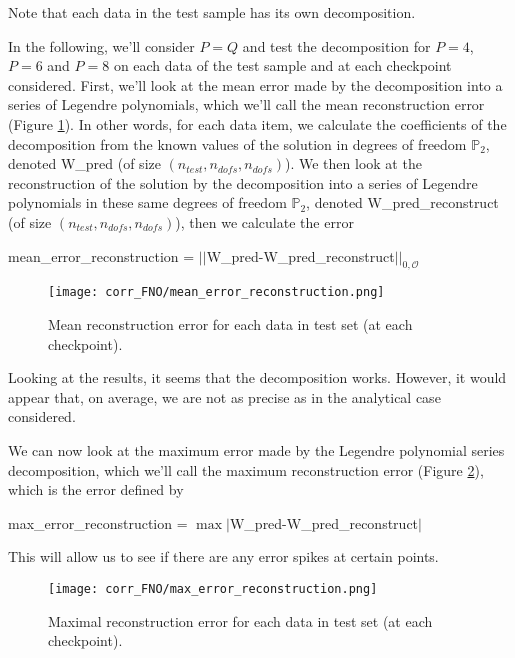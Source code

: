\begin{Rem}
	Note that each data in the test sample has its own decomposition.
\end{Rem}

In the following, we'll consider $P=Q$ and test the decomposition for $P=4$, $P=6$ and $P=8$ on each data of the test sample and at each checkpoint considered. First, we'll look at the mean error made by the decomposition into a series of Legendre polynomials, which we'll call the mean reconstruction error (Figure \ref{mean_error_reconstruction}). In other words, for each data item, we calculate the coefficients of the decomposition from the known values of the solution in degrees of freedom $\mathbb{P}_2$, denoted W\_pred (of size $(n_{test},n_{dofs},n_{dofs})$). We then look at the reconstruction of the solution by the decomposition into a series of Legendre polynomials in these same degrees of freedom $\mathbb{P}_2$, denoted W\_pred\_reconstruct (of size $(n_{test},n_{dofs},n_{dofs})$), then we calculate the error
\begin{center}
	 mean\_error\_reconstruction = $||$W\_pred-W\_pred\_reconstruct$||_{0,\mathcal{O}}$
\end{center}

\begin{figure}[H]
	\centering
	\texttt{[image: corr\_FNO/mean\_error\_reconstruction.png]}
	\caption{Mean reconstruction error for each data in test set (at each checkpoint).}
	\label{mean_error_reconstruction}
\end{figure} 

Looking at the results, it seems that the decomposition works. However, it would appear that, on average, we are not as precise as in the analytical case considered.

We can now look at the maximum error made by the Legendre polynomial series decomposition, which we'll call the maximum reconstruction error (Figure \ref{max_error_reconstruction}), which is the error defined by
\begin{center}
	max\_error\_reconstruction = $\max|$W\_pred-W\_pred\_reconstruct$|$
\end{center}
This will allow us to see if there are any error spikes at certain points.

\begin{figure}[H]
	\centering
	\texttt{[image: corr\_FNO/max\_error\_reconstruction.png]}
	\caption{Maximal reconstruction error for each data in test set (at each checkpoint).}
	\label{max_error_reconstruction}
\end{figure} 

